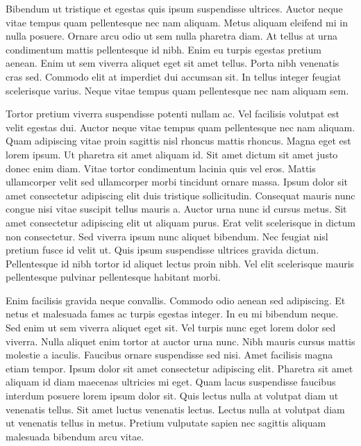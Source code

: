 \documentclass[11pt,a4paper]{article}
\begin{document}
Bibendum ut tristique et egestas quis ipsum suspendisse ultrices. Auctor neque vitae tempus quam pellentesque nec nam aliquam. Metus aliquam eleifend mi in nulla posuere. Ornare arcu odio ut sem nulla pharetra diam. At tellus at urna condimentum mattis pellentesque id nibh. Enim eu turpis egestas pretium aenean. Enim ut sem viverra aliquet eget sit amet tellus. Porta nibh venenatis cras sed. Commodo elit at imperdiet dui accumsan sit. In tellus integer feugiat scelerisque varius. Neque vitae tempus quam pellentesque nec nam aliquam sem.

Tortor pretium viverra suspendisse potenti nullam ac. Vel facilisis volutpat est velit egestas dui. Auctor neque vitae tempus quam pellentesque nec nam aliquam. Quam adipiscing vitae proin sagittis nisl rhoncus mattis rhoncus. Magna eget est lorem ipsum. Ut pharetra sit amet aliquam id. Sit amet dictum sit amet justo donec enim diam. Vitae tortor condimentum lacinia quis vel eros. Mattis ullamcorper velit sed ullamcorper morbi tincidunt ornare massa. Ipsum dolor sit amet consectetur adipiscing elit duis tristique sollicitudin. Consequat mauris nunc congue nisi vitae suscipit tellus mauris a. Auctor urna nunc id cursus metus. Sit amet consectetur adipiscing elit ut aliquam purus. Erat velit scelerisque in dictum non consectetur. Sed viverra ipsum nunc aliquet bibendum. Nec feugiat nisl pretium fusce id velit ut. Quis ipsum suspendisse ultrices gravida dictum. Pellentesque id nibh tortor id aliquet lectus proin nibh. Vel elit scelerisque mauris pellentesque pulvinar pellentesque habitant morbi.

Enim facilisis gravida neque convallis. Commodo odio aenean sed adipiscing. Et netus et malesuada fames ac turpis egestas integer. In eu mi bibendum neque. Sed enim ut sem viverra aliquet eget sit. Vel turpis nunc eget lorem dolor sed viverra. Nulla aliquet enim tortor at auctor urna nunc. Nibh mauris cursus mattis molestie a iaculis. Faucibus ornare suspendisse sed nisi. Amet facilisis magna etiam tempor. Ipsum dolor sit amet consectetur adipiscing elit. Pharetra sit amet aliquam id diam maecenas ultricies mi eget. Quam lacus suspendisse faucibus interdum posuere lorem ipsum dolor sit. Quis lectus nulla at volutpat diam ut venenatis tellus. Sit amet luctus venenatis lectus. Lectus nulla at volutpat diam ut venenatis tellus in metus. Pretium vulputate sapien nec sagittis aliquam malesuada bibendum arcu vitae.
\end{document}
